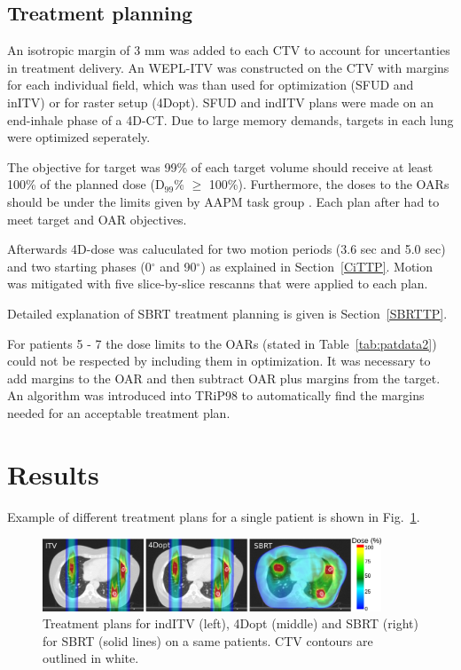 \documentclass[type=dr, dr=rernat, accentcolor=tud7b,colorbacktitle, bigchapter, openright, twoside, 12pt ]{tudthesis}
\begin{document}
\subsection{Treatment planning}

An isotropic margin of 3 mm was added to each CTV to account for uncertanties in treatment delivery. An WEPL-ITV was constructed on the CTV with margins for each individual field, which was than used for optimization (SFUD
and inITV) or for raster setup (4Dopt). SFUD and indITV plans were made on an end-inhale phase of a 4D-CT. Due to large memory demands, targets in each lung were optimized seperately. 
  
The objective for target was 99\% of each target volume should receive at least 100\% of the planned dose (D$_{99}$\% $\geq$ 100\%). Furthermore, the doses to the OARs should be under the limits given by AAPM task group \cite{Benedict2010}. 
Each plan after had to meet target and OAR objectives. 

Afterwards 4D-dose was caluculated for two motion periods (3.6 sec and 5.0 sec) and two starting phases (0$^\circ$ and 90$^\circ$) as explained in Section~\ref{CiTTP}. Motion was mitigated with five 
slice-by-slice rescanns that were applied to each plan.

Detailed explanation of SBRT treatment planning is given is Section~\ref{SBRTTP}.

For patients 5 - 7 the dose limits to the OARs (stated in Table~\ref{tab:patdata2}) could not be respected by including them in optimization. It was necessary to add margins to the OAR and then 
subtract OAR plus margins from the target. An algorithm was introduced into TRiP98 to automatically find the margins needed for an acceptable treatment plan.

\section{Results}

Example of different treatment plans for a single patient is shown in Fig.~\ref{Fig:multiExample}.

\begin{figure}[H]
	\begin{center}
		\includegraphics[width=0.9\textwidth]{./Images/multiExample.png}
		\caption{Treatment plans for indITV (left), 4Dopt (middle) and SBRT (right) for SBRT (solid lines) on a same patients. CTV contours are outlined in white.}
		\label{Fig:multiExample}
	\end{center}
\end{figure}
\end{document}
